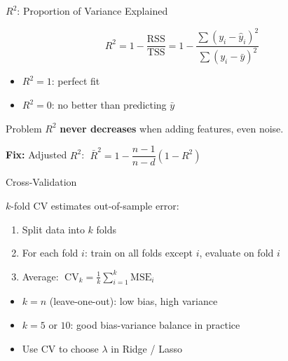 \documentclass[aspectratio=169, professionalfonts]{beamer}
\begin{document}
\begin{frame}{$R^2$: Proportion of Variance Explained}

$$R^2 = 1 - \frac{\text{RSS}}{\text{TSS}}
  = 1 - \frac{\sum(y_i - \hat{y}_i)^2}{\sum(y_i - \bar{y})^2}$$

\bigskip

\begin{itemize}
  \item $R^2 = 1$: perfect fit
  \item $R^2 = 0$: no better than predicting $\bar{y}$
\end{itemize}

\bigskip

\begin{alertblock}{Problem}
$R^2$ \textbf{never decreases} when adding features, even noise.
\end{alertblock}

\textbf{Fix:} Adjusted $R^2$:
$\;\bar{R}^2 = 1 - \dfrac{n-1}{n-d}(1 - R^2)$

\end{frame}

\begin{frame}{Cross-Validation}

$k$-fold CV estimates out-of-sample error:

\begin{enumerate}
  \item Split data into $k$ folds
  \item For each fold $i$: train on all folds except $i$,
        evaluate on fold $i$
  \item Average:
        $\;\text{CV}_k = \frac{1}{k}\sum_{i=1}^k \text{MSE}_i$
\end{enumerate}

\bigskip

\begin{itemize}
  \item $k = n$ (leave-one-out): low bias, high variance
  \item $k = 5$ or $10$: good bias-variance balance in practice
  \item Use CV to choose $\lambda$ in Ridge / Lasso
\end{itemize}

\end{frame}

\end{document}
